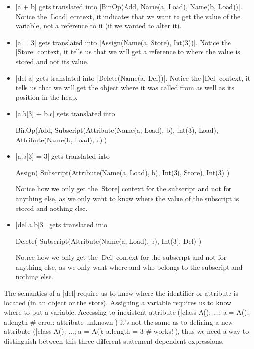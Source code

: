 \begin{itemize}
\item
  \pycode|a + b| gets translated into
  \pycode|BinOp(Add, Name(a, Load), Name(b, Load))|. Notice the
  \pycode|Load| context, it indicates that we want to get the value of
  the variable, not a reference to it (if we wanted to alter it).
\item
  \pycode|a = 3| gets translated into
  \pycode|Assign(Name(a, Store), Int(3))|. Notice the \pycode|Store|
  context, it tells us that we will get a reference to where the value
  is stored and not its value.
\item
  \pycode|del a| gets translated into \pycode|Delete(Name(a, Del))|.
  Notice the \pycode|Del| context, it tells us that we will get the
  object where it was called from as well as its position in the heap.
\item
  \pycode|a.b[3] + b.c| gets translated into

\begin{pythoncode}
BinOp(Add,
  Subscript(Attribute(Name(a, Load), b), Int(3), Load),
  Attribute(Name(b, Load), c)
)
\end{pythoncode}
\item
  \pycode|a.b[3] = 3| gets translated into

\begin{pythoncode}
Assign(
  Subscript(Attribute(Name(a, Load), b), Int(3), Store),
  Int(3)
)
\end{pythoncode}

  Notice how we only get the \pycode|Store| context for the subscript
  and not for anything else, as we only want to know where the value of
  the subscript is stored and nothing else.
\item
  \pycode|del a.b[3]| gets translated into

\begin{pythoncode}
Delete(
  Subscript(Attribute(Name(a, Load), b), Int(3), Del)
)
\end{pythoncode}

  Notice how we only get the \pycode|Del| context for the subscript and
  not for anything else, as we only want where and who belongs to the
  subscript and nothing else.
\end{itemize}

The semantics of a \pycode|del| require us
to know where the identifier or attribute is located (in an object or
the store). Assigning a variable requires us to know where to put a
variable. Accessing to inexistent attribute
(\pycode|class A(): ...; a = A(); a.length # error: attribute unknown|)
it's not the same as to defining a new attribute
(\pycode|class A(): ...; a = A(); a.length = 3 # works!|),
thus we need a way to distinguish between this three different
statement-dependent expressions.

